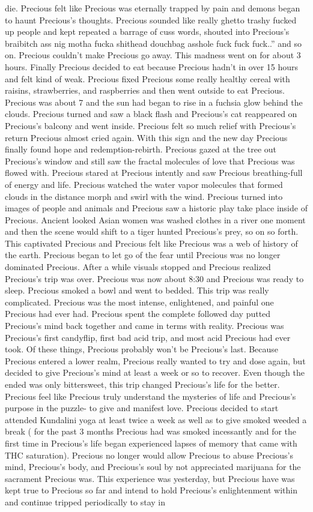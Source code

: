 \documentclass[12pt]{book}
\begin{document}
die. Precious felt like Precious was eternally trapped by pain and demons began to haunt Precious's thoughts. Precious sounded like really ghetto trashy fucked up people and kept repeated a barrage of cuss words, shouted into Precious's braibitch ass nig motha fucka shithead douchbag asshole fuck fuck fuck..'' and so on. Precious couldn't make Precious go away. This madness went on for about 3 hours. Finally Precious decided to eat because Precious hadn't in over 15 hours and felt kind of weak. Precious fixed Precious some really healthy cereal with raisins, strawberries, and raspberries and then went outside to eat Precious. Precious was about 7 and the sun had began to rise in a fuchsia glow behind the clouds. Precious turned and saw a black flash and Precious's cat reappeared on Precious's balcony and went inside. Precious felt so much relief with Precious's return Precious almost cried again. With this sign and the new day Precious finally found hope and redemption-rebirth. Precious gazed at the tree out Precious's window and still saw the fractal molecules of love that Precious was flowed with. Precious stared at Precious intently and saw Precious breathing-full of energy and life. Precious watched the water vapor molecules that formed clouds in the distance morph and swirl with the wind. Precious turned into images of people and animals and Precious saw a historic play take place inside of Precious. Ancient looked Asian women was washed clothes in a river one moment and then the scene would shift to a tiger hunted Precious's prey, so on so forth. This captivated Precious and Precious felt like Precious was a web of history of the earth. Precious began to let go of the fear until Precious was no longer dominated Precious. After a while visuals stopped and Precious realized Precious's trip was over. Precious was now about 8:30 and Precious was ready to sleep. Precious smoked a bowl and went to bedded. This trip was really complicated. Precious was the most intense, enlightened, and painful one Precious had ever had. Precious spent the complete followed day putted Precious's mind back together and came in terms with reality. Precious was Precious's first candyflip, first bad acid trip, and most acid Precious had ever took. Of these things, Precious probably won't be Precious's last. Because Precious entered a lower realm, Precious really wanted to try and dose again, but decided to give Precious's mind at least a week or so to recover. Even though the ended was only bittersweet, this trip changed Precious's life for the better. Precious feel like Precious truly understand the mysteries of life and Precious's purpose in the puzzle- to give and manifest love. Precious decided to start attended Kundalini yoga at least twice a week as well as to give smoked weeded a break ( for the past 3 months Precious had was smoked incessantly and for the first time in Precious's life began experienced lapses of memory that came with THC saturation). Precious no longer would allow Precious to abuse Precious's mind, Precious's body, and Precious's soul by not appreciated marijuana for the sacrament Precious was. This experience was yesterday, but Precious have was kept true to Precious so far and intend to hold Precious's enlightenment within and continue tripped periodically to stay in 
\end{document}
